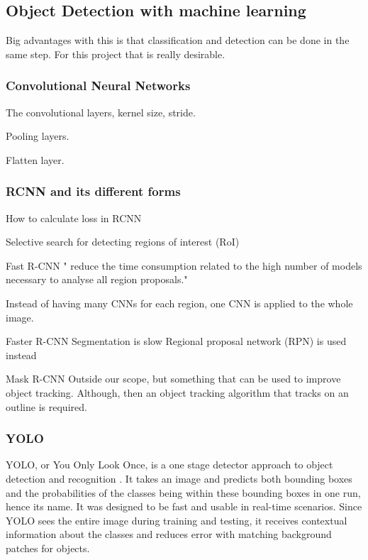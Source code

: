 \subsection{Object Detection with machine learning}

Big advantages with this is that classification and detection can be done in the same
 step. For this project that is really desirable.
 
 \subsubsection{Convolutional Neural Networks}
 
 The convolutional layers, kernel size, stride.
 
 Pooling layers.
 
 Flatten layer.

\subsubsection{RCNN and its different forms}

How to calculate loss in RCNN

Selective search for detecting regions of interest (RoI)

Fast R-CNN
" reduce the time consumption related to the high number of models necessary to analyse all region proposals."

Instead of having many CNNs for each region, one CNN is applied to the whole image.

Faster R-CNN
Segmentation is slow
Regional proposal network (RPN) is used instead

Mask R-CNN
Outside our scope, but something that can be used to improve object tracking.
Although, then an object tracking algorithm that tracks on an outline is required.

\subsubsection{YOLO}
YOLO, or You Only Look Once, is a one stage detector approach to object detection and
 recognition \cite{YOLO1}. It takes an image and predicts both bounding boxes and the probabilities of the classes being within these bounding boxes in one run, hence its name. It was designed to be fast and usable in real-time scenarios. Since YOLO sees the entire image during training and testing, it receives contextual information about the classes and reduces error with matching background patches for objects. 
 
